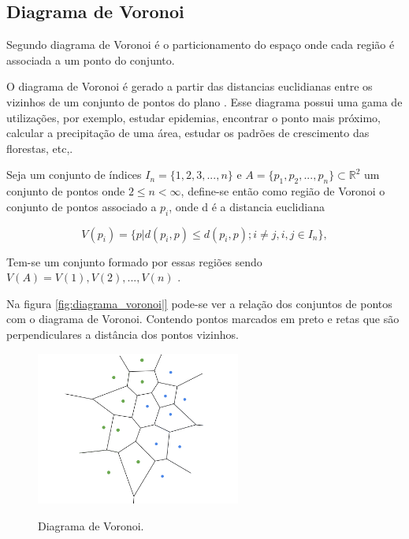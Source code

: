 \subsection{Diagrama de Voronoi}

Segundo  diagrama de Voronoi é o particionamento do espaço onde cada região é associada a um ponto do conjunto.

O diagrama de Voronoi é gerado a partir das distancias euclidianas entre os vizinhos de um conjunto de pontos do plano\space
\cite{diagrama_de_voronoi:_uma_exploracao_nas_distancias_euclidiana_e_do_taxi}. Esse diagrama possui uma gama de utilizações, por exemplo, estudar epidemias, encontrar o
ponto mais próximo, calcular a precipitação de uma área, estudar os padrões de crescimento das florestas, etc,\space\cite{poligonos_de_thiessen_ou_voronoi}.

Seja um conjunto de índices $I_n = \{1, 2, 3, ..., n\}$ e $A = \{p_1, p_2, ..., p_n\} \subset \mathbb{R}^2$ um conjunto de pontos onde $2 \leq n < \infty$, define-se então como região de Voronoi o conjunto de pontos associado a $p_i$, onde d é a distancia euclidiana

\begin{equation}
	V(p_i) = \{p|d(p_i,p) \leq d(p_i,p);i \neq j, i, j \in I_n\},
\end{equation}

Tem-se um conjunto formado por essas regiões sendo $V(A) = {V(1), V(2), ..., V(n)}$ \space\cite{rodrigues_diagrama_2019}.

Na figura \cref{fig:diagrama_voronoi|} pode-se ver a relação dos conjuntos de pontos com o diagrama de Voronoi. Contendo pontos marcados em preto e retas que são perpendiculares a distância dos pontos vizinhos.

\begin{figure}[ht]
	\centering
	\caption{Diagrama de Voronoi.}
	\includegraphics[width=0.6\textwidth]{figures/diagrama_de_voronoi.png}
	\label{fig:diagrama_voronoi}
\end{figure}
